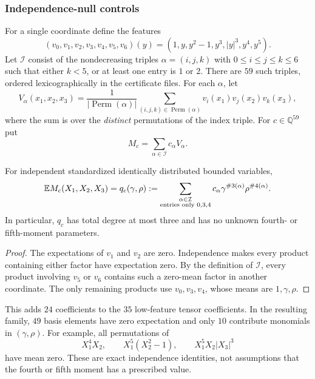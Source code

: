 \subsubsection{Independence-null controls}
For a single coordinate define the features
\begin{equation}\label{ms:finite:n3:eq:features}
 (v_0,v_1,v_2,v_3,v_4,v_5,v_6)(y)
 =(1,y,y^2-1,y^3,|y|^3,y^4,y^5).
\end{equation}
Let $\mathcal I$ consist of the nondecreasing triples
$\alpha=(i,j,k)$ with $0\le i\le j\le k\le6$ such that either
$k<5$, or at least one entry is $1$ or $2$. There are $59$ such triples,
ordered lexicographically in the certificate files.
For each $\alpha$, let
\[
 V_\alpha(x_1,x_2,x_3)
 =\frac1{|\operatorname{Perm}(\alpha)|}
   \sum_{(i,j,k)\in\operatorname{Perm}(\alpha)}
        v_i(x_1)v_j(x_2)v_k(x_3),
\]
where the sum is over the \emph{distinct} permutations of the index triple.
For $c\in\mathbb Q^{59}$ put
\begin{equation}\label{ms:finite:n3:eq:majorant}
 M_c=\sum_{\alpha\in\mathcal I}c_\alpha V_\alpha.
\end{equation}

\begin{lemma}\label{ms:finite:n3:lem:expect}
For independent standardized identically distributed bounded variables,
\begin{equation}\label{ms:finite:n3:eq:expect}
 \mathbb E M_c(X_1,X_2,X_3)=q_c(\gamma,\rho)
 :=\sum_{\substack{\alpha\in\mathcal I\\
                    \text{entries only }0,3,4}}
        c_\alpha\gamma^{\#3(\alpha)}\rho^{\#4(\alpha)}.
\end{equation}
In particular, $q_c$ has total degree at most three and has no unknown
fourth- or fifth-moment parameters.
\end{lemma}
\begin{proof}
The expectations of $v_1$ and $v_2$ are zero. Independence makes every
product containing either factor have expectation zero. By the definition
of $\mathcal I$, every product involving $v_5$ or $v_6$ contains such a
zero-mean factor in another coordinate. The only remaining products use
$v_0,v_3,v_4$, whose means are $1,\gamma,\rho$.
\end{proof}
This adds $24$ coefficients to the $35$ low-feature tensor coefficients.
In the resulting family, $49$ basis elements have zero expectation and
only $10$ contribute monomials in $(\gamma,\rho)$.
For example, all permutations of
\[
 X_1^4X_2,
 \qquad X_1^5(X_2^2-1),
 \qquad X_1^5X_2|X_3|^3
\]
have mean zero. These are exact independence identities, not assumptions
that the fourth or fifth moment has a prescribed value.

